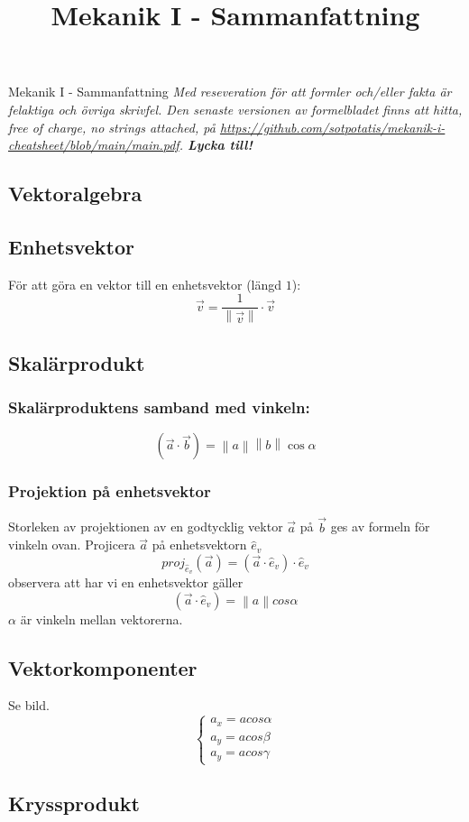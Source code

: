 \documentclass{article}
\title{Mekanik I - Sammanfattning}
\date{}
\newcommand{\midtitle}[1]{
\begin{center}
\Huge{\text{#1}}
\newpage
\end{center}
}
\begin{document}
\Huge{Mekanik I - Sammanfattning}
\large\newline
\textit{Med reseveration för att formler och/eller fakta är felaktiga och övriga skrivfel. Den senaste versionen av formelbladet finns att hitta, free of charge, no strings attached, på \url{https://github.com/sotpotatis/mekanik-i-cheatsheet/blob/main/main.pdf}. \textbf{Lycka till!}}
\newpage
\midtitle{Statik}
\begin{paracol}{2}
\section{Vektoralgebra}
\subsection{Enhetsvektor}
För att göra en vektor till en enhetsvektor (längd $1$):
$$
\boxed{
\vec v = \frac{1}{\left\| \vec v \right\|} \cdot \vec v
}
$$
\subsection{Skalärprodukt}
\subsubsection{Skalärproduktens samband med vinkeln:}
$$
\boxed{
(\vec a \cdot \vec b)=\left\|a\right\|\left\|b\right\|\cos\alpha
}
$$
\subsubsection{Projektion på enhetsvektor}
Storleken av projektionen av en godtycklig vektor $\vec a$ på $\vec b$ ges av formeln för vinkeln ovan.
Projicera $\vec a$ på enhetsvektorn $\hat e_v$ 
$$
proj_{\hat e_v}(\vec a)=(\vec a \cdot \hat e_v)\cdot \hat e_v
$$
observera att har vi en enhetsvektor gäller
$$
(\vec a \cdot \hat e_v)=\left\|a\right\|cos\alpha
$$
$\alpha$ är vinkeln mellan vektorerna.

\subsection{Vektorkomponenter}
Se bild.
$$
\begin{cases}
a_x = acos\alpha\\
a_y = acos\beta\\
a_y = acos\gamma
\end{cases}
$$
\subsection{Kryssprodukt}

\end{paracol}
\end{document}
